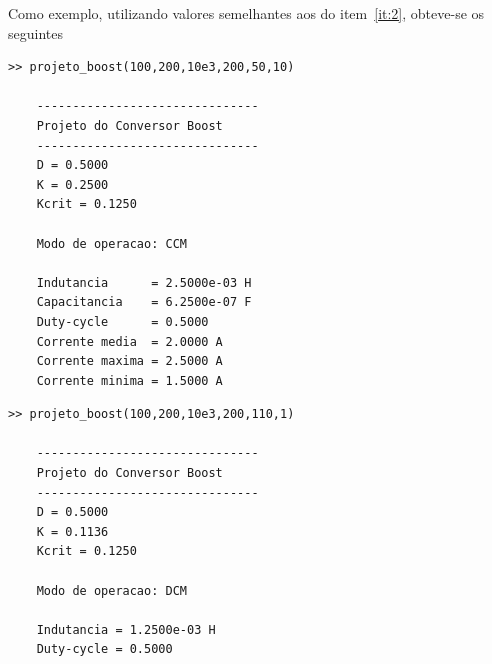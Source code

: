 Como exemplo, utilizando valores semelhantes aos do item~\ref{it:2}, obteve-se os seguintes

\begin{lstlisting}[caption={Exemplo 1 - CCM.},label={lst:item5a}]
	>> projeto_boost(100,200,10e3,200,50,10)
	
	-------------------------------
	Projeto do Conversor Boost
	-------------------------------
	D = 0.5000
	K = 0.2500
	Kcrit = 0.1250
	
	Modo de operacao: CCM
	
	Indutancia      = 2.5000e-03 H
	Capacitancia    = 6.2500e-07 F
	Duty-cycle      = 0.5000
	Corrente media  = 2.0000 A
	Corrente maxima = 2.5000 A
	Corrente minima = 1.5000 A
\end{lstlisting}

\begin{lstlisting}[caption={Exemplo 2 - DCM.},label={lst:item5b}]
	>> projeto_boost(100,200,10e3,200,110,1)
	
	-------------------------------
	Projeto do Conversor Boost
	-------------------------------
	D = 0.5000
	K = 0.1136
	Kcrit = 0.1250
	
	Modo de operacao: DCM
	
	Indutancia = 1.2500e-03 H
	Duty-cycle = 0.5000
\end{lstlisting}
